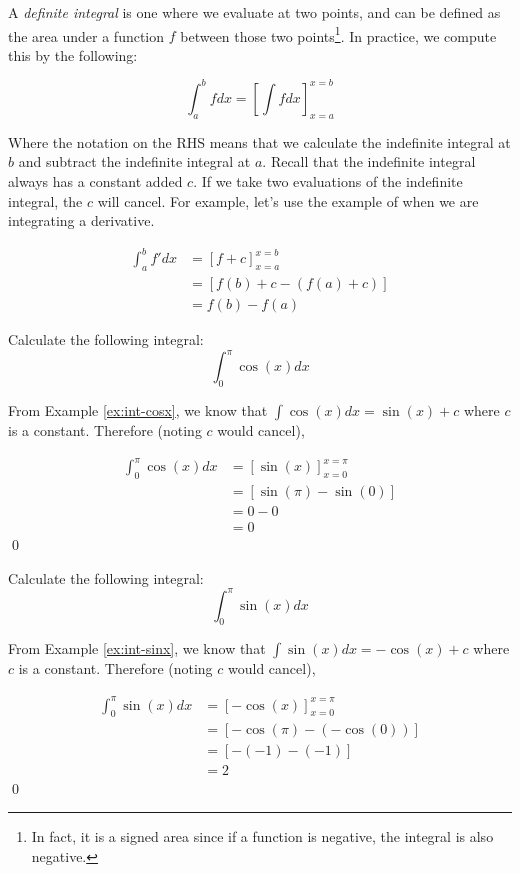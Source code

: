 A \emph{definite integral} is one where we evaluate at two points, and can be defined as the area under a function $f$ between those two points\footnote{In fact, it is a signed area since if a function is negative, the integral is also negative.}. 
In practice, we compute this by the following:

\[ \int_{a}^{b} f dx = \left[\int f dx\right]_{x=a}^{x=b}\]

Where the notation on the RHS means that we calculate the indefinite integral at $b$ and subtract the indefinite integral at $a$. Recall that 
the indefinite integral always has a constant added $c$. If we take two evaluations of the indefinite integral, the $c$ will cancel. For example, let's use 
the example of when we are integrating a derivative.

\begin{align*}
    \int_{a}^{b} f' dx &= \left[f + c\right]_{x=a}^{x=b} \tag{substitute indefinite integral of $f'$}\\
    &= [f(b) + c - (f(a) + c)] \tag{expand}\\
    &= f(b) - f(a) \tag{cancel $c$}
\end{align*}

\begin{example}
    Calculate the following integral:
    \[ \int_{0}^{\pi} \cos (x)dx\]
\end{example}
\begin{solution}
    From Example \ref{ex:int-cosx}, we know that $\int \cos(x) dx = \sin (x) + c$ where $c$ is a constant.
    Therefore (noting $c$ would cancel),

    \begin{align*}
        \int_{0}^{\pi} \cos(x) dx & = [\sin (x)]_{x=0}^{x=\pi} \\ 
          &= [\sin(\pi) - \sin (0)] \\
          &= 0 - 0 \\
          &= 0
    \end{align*}
    \qed
\end{solution}

\begin{example}
    Calculate the following integral:
    \[ \int_{0}^{\pi} \sin (x)dx\]
\end{example}
\begin{solution}
    From Example \ref{ex:int-sinx}, we know that $\int \sin(x) dx = -\cos (x) + c$ where $c$ is a constant.
    Therefore (noting $c$ would cancel),

    \begin{align*}
        \int_{0}^{\pi} \sin(x) dx & = [-\cos (x)]_{x=0}^{x=\pi} \\ 
          &= [-\cos(\pi) - (-\cos (0))] \\
          &= [-(-1) - (-1)]  \tag{$\cos(0) = 1$, $\cos(\pi)=-1$}\\
          &= 2
    \end{align*}
    \qed
\end{solution}

